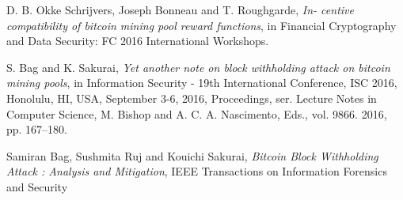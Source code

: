 \documentclass[12pt]{article}
\begin{document}
\begin{thebibliography}{8}
 D. B. Okke Schrijvers, Joseph Bonneau and T. Roughgarde, 
 \textit{In- centive compatibility of bitcoin mining pool reward functions}, in Financial Cryptography and Data Security: FC 2016 International Workshops.
 
 S. Bag and K. Sakurai, 
 \textit{Yet another note on block withholding attack on bitcoin mining pools}, in Information Security - 19th International Conference, ISC 2016, Honolulu, HI, USA, September 3-6, 2016, Proceedings, ser. Lecture Notes in Computer Science,
 M. Bishop and A. C. A. Nascimento, Eds., vol. 9866. 2016, pp. 167–180.
 
 Samiran Bag, Sushmita Ruj and Kouichi Sakurai, 
 \textit{Bitcoin Block Withholding Attack : Analysis and
Mitigation},
IEEE Transactions on Information Forensics and Security

 
\end{thebibliography}
\end{document}
